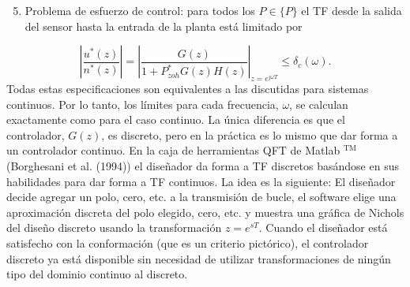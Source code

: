 \begin{enumerate}
  \setcounter{enumi}{4}
  \item Problema de esfuerzo de control: para todos los $P \in\{P\}$ el TF desde la salida del sensor hasta la entrada de la planta está limitado por
\end{enumerate}
$$
\left|\frac{u^{*}(z)}{n^{*}(z)}\right|=\left|\frac{G(z)}{1+P_{z o h}^{*} G(z) H(z)}\right|_{z=e^{j \omega T}} \leq \delta_{c}(\omega) .
$$
Todas estas especificaciones son equivalentes a las discutidas para sistemas continuos. Por lo tanto, los límites para cada frecuencia, $\omega$, se calculan exactamente como para el caso continuo. La única diferencia es que el controlador, $G(z)$, es discreto, pero en la práctica es lo mismo que dar forma a un controlador continuo. En la caja de herramientas QFT de Matlab ${ }^{\mathrm{TM}}$ (Borghesani et al. (1994)) el diseñador da forma a TF discretos basándose en sus habilidades para dar forma a TF continuos. La idea es la siguiente: El diseñador decide agregar un polo, cero, etc. a la transmisión de bucle, el software elige una aproximación discreta del polo elegido, cero, etc. y muestra una gráfica de Nichols del diseño discreto usando la transformación $z=e^{s T}$. Cuando el diseñador está 	satisfecho con la conformación (que es un criterio pictórico), el controlador discreto ya está disponible sin necesidad de utilizar transformaciones de ningún tipo del dominio continuo al discreto.


%